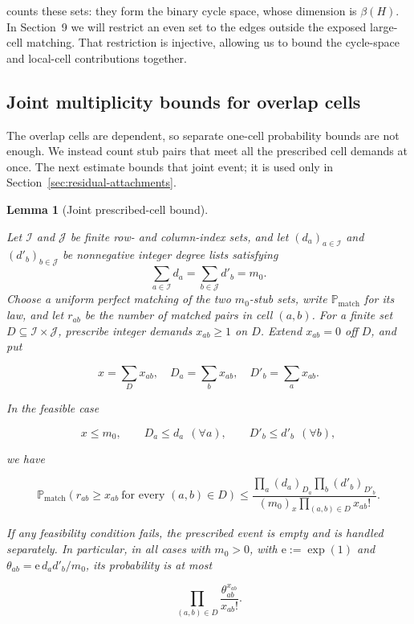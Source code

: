 \documentclass[a4paper,10pt,reqno]{amsart}
\numberwithin{equation}{section}
\theoremstyle{plain}
\newtheorem{lemma}[theorem]{Lemma}
\theoremstyle{remark}
\begin{document}
counts these sets: they form the binary cycle space, whose dimension is
\(\beta(H)\). In Section~9 we will restrict an even set to the edges outside
the exposed large-cell matching. That restriction is injective, allowing
us to bound the cycle-space and local-cell contributions together.

\subsection*{Joint multiplicity bounds for overlap cells}

The overlap cells are dependent, so separate one-cell probability bounds
are not enough. We instead count stub pairs that meet all the prescribed
cell demands at once. The next estimate bounds that joint event; it is
used only in Section~\ref{sec:residual-attachments}.

\begin{lemma}[Joint prescribed-cell bound]
\label{lemma-6.2-joint-prescribed-cell-bound}

Let $\mathcal I$ and $\mathcal J$ be finite row- and column-index sets, and
let $(d_a)_{a\in\mathcal I}$ and $(d'_b)_{b\in\mathcal J}$ be nonnegative
integer degree lists satisfying
\[
  \sum_{a\in\mathcal I}d_a=
  \sum_{b\in\mathcal J}d'_b=m_0.
\]
Choose a uniform perfect matching of the two $m_0$-stub sets, write
$\mathbb P_{\mathrm{match}}$ for its law, and let
$r_{ab}$ be the number of matched pairs in cell $(a,b)$. For a finite set
$D\subseteq\mathcal I\times\mathcal J$, prescribe integer demands
$x_{ab}\ge1$ on $D$. Extend $x_{ab}=0$ off $D$, and put

\[
 x=\sum_Dx_{ab},\quad D_a=\sum_bx_{ab},\quad
 D'_b=\sum_ax_{ab}.
\]

In the feasible case

\[
 x\le m_0,\qquad D_a\le d_a\ \ (\forall a),\qquad
 D'_b\le d'_b\ \ (\forall b),
\]

we have

\[
 \mathbb P_{\mathrm{match}}(r_{ab}\ge x_{ab}\ \text{for every }(a,b)\in D)
 \le\frac{\prod_a(d_a)_{D_a}\prod_b(d'_b)_{D'_b}}
          {(m_0)_x\prod_{(a,b)\in D}x_{ab}!}.             \tag{6.8}
\]

If any feasibility condition fails, the prescribed event is empty and is
handled separately. In particular, in all cases with \(m_0>0\), with
\(\mathrm{e}:=\exp(1)\) and
\(\theta_{ab}=\mathrm{e}\, d_a d'_b/m_0\),
its probability is at most

\[
 \prod_{(a,b)\in D}\frac{\theta_{ab}^{x_{ab}}}{x_{ab}!}.  \tag{6.9}
\]

\end{lemma}
\end{document}
